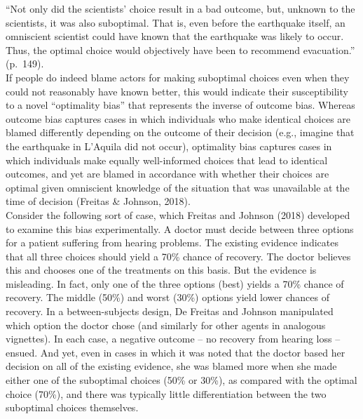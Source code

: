\documentclass[
  man,floatsintext]{apa6}
\begin{document}
``Not only did the scientists' choice result in a bad outcome, but, unknown to the scientists, it was also suboptimal. That is, even before the earthquake itself, an omniscient scientist could have known that the earthquake was likely to occur. Thus, the optimal choice would objectively have been to recommend evacuation.'' (p.~149).\\
If people do indeed blame actors for making suboptimal choices even when they could not reasonably have known better, this would indicate their susceptibility to a novel ``optimality bias'' that represents the inverse of outcome bias. Whereas outcome bias captures cases in which individuals who make identical choices are blamed differently depending on the outcome of their decision (e.g., imagine that the earthquake in L'Aquila did not occur), optimality bias captures cases in which individuals make equally well-informed choices that lead to identical outcomes, and yet are blamed in accordance with whether their choices are optimal given omniscient knowledge of the situation that was unavailable at the time of decision (Freitas \& Johnson, 2018).\\
Consider the following sort of case, which Freitas and Johnson (2018) developed to examine this bias experimentally. A doctor must decide between three options for a patient suffering from hearing problems. The existing evidence indicates that all three choices should yield a 70\% chance of recovery. The doctor believes this and chooses one of the treatments on this basis. But the evidence is misleading. In fact, only one of the three options (best) yields a 70\% chance of recovery. The middle (50\%) and worst (30\%) options yield lower chances of recovery. In a between-subjects design, De Freitas and Johnson manipulated which option the doctor chose (and similarly for other agents in analogous vignettes). In each case, a negative outcome -- no recovery from hearing loss -- ensued. And yet, even in cases in which it was noted that the doctor based her decision on all of the existing evidence, she was blamed more when she made either one of the suboptimal choices (50\% or 30\%), as compared with the optimal choice (70\%), and there was typically little differentiation between the two suboptimal choices themselves.\\
\end{document}
